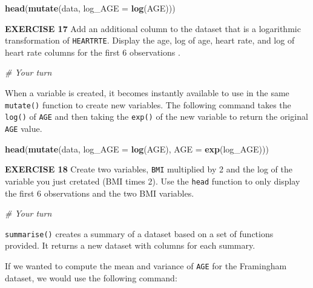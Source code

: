 \documentclass[
]{article}
\newenvironment{Shaded}{\begin{snugshade}}{\end{snugshade}}
\newcommand{\CommentTok}[1]{\textcolor[rgb]{0.56,0.35,0.01}{\textit{#1}}}
\newcommand{\DataTypeTok}[1]{\textcolor[rgb]{0.13,0.29,0.53}{#1}}
\newcommand{\KeywordTok}[1]{\textcolor[rgb]{0.13,0.29,0.53}{\textbf{#1}}}
\newcommand{\NormalTok}[1]{#1}
\begin{document}
\begin{Shaded}
\begin{Highlighting}[]
\KeywordTok{head}\NormalTok{(}\KeywordTok{mutate}\NormalTok{(data, }\DataTypeTok{log_AGE =} \KeywordTok{log}\NormalTok{(AGE)))}
\end{Highlighting}
\end{Shaded}

\textbf{EXERCISE 17} Add an additional column to the dataset that is a
logarithmic transformation of \texttt{HEARTRTE}. Display the age, log of
age, heart rate, and log of heart rate columns for the first 6
observations .

\begin{Shaded}
\begin{Highlighting}[]
\CommentTok{# Your turn}
\end{Highlighting}
\end{Shaded}

When a variable is created, it becomes instantly available to use in the
same \texttt{mutate()} function to create new variables. The following
command takes the \texttt{log()} of \texttt{AGE} and then taking the
\texttt{exp()} of the new variable to return the original \texttt{AGE}
value.

\begin{Shaded}
\begin{Highlighting}[]
\KeywordTok{head}\NormalTok{(}\KeywordTok{mutate}\NormalTok{(data, }\DataTypeTok{log_AGE =} \KeywordTok{log}\NormalTok{(AGE), }\DataTypeTok{AGE =} \KeywordTok{exp}\NormalTok{(log_AGE)))}
\end{Highlighting}
\end{Shaded}

\textbf{EXERCISE 18} Create two variables, \texttt{BMI} multiplied by 2
and the log of the variable you just cretated (BMI times 2). Use the
\texttt{head} function to only display the first 6 observations and the
two BMI variables.

\begin{Shaded}
\begin{Highlighting}[]
\CommentTok{# Your turn}
\end{Highlighting}
\end{Shaded}

\texttt{summarise()} creates a summary of a dataset based on a set of
functions provided. It returns a new dataset with columns for each
summary.

If we wanted to compute the mean and variance of \texttt{AGE} for the
Framingham dataset, we would use the following command:
\end{document}
